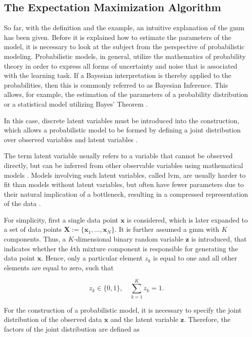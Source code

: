 \documentclass[../../../main.tex]{subfiles}
\begin{document}
\subsection{The Expectation Maximization Algorithm}
So far, with the definition and the example, an intuitive explanation of the \acrshort{gmm} has been given. Before it is explained how to estimate the parameters of the model, it is necessary to look at the subject from the perspective of probabilistic modeling. Probabilistic models, in general, utilize the mathematics of probability theory in order to express all forms of uncertainty and noise that is associated with the learning task. If a Bayesian interpretation is thereby applied to the probabilities, then this is commonly referred to as Bayesian Inference. This allows, for example, the estimation of the parameters of a probability distribution or a statistical model utilizing Bayes' Theorem \cite[p.245]{dei_2020}. 

In this case, discrete latent variables must be introduced into the construction, which allows a probabilistic model to be formed by defining a joint distribution over observed variables and latent variables \cite[432]{bis_2006}. 

The term latent variable usually refers to a variable that cannot be observed directly, but can be inferred from other observable variables using mathematical models \cite{bor_2003}. Models involving such latent variables, called \acrshort{lvm}, are usually harder to fit than models without latent variables, but often have fewer parameters due to their natural implication of a bottleneck, resulting in a compressed representation of the data \cite[337]{mur_2012}. 

For simplicity, first a single data point $\bm{x}$ is considered, which is later expanded to a set of data points $\bm{X}:=\{\bm{x}_1, \dots, \bm{x}_N\}$. It is further assumed a \acrshort{gmm} with $K$ components. Thus, a $K$-dimensional binary random variable $\bm{z}$ is introduced, that indicates whether the $k$th mixture component is responsible for generating the data point $\bm{x}$. Hence, only a particular element $z_k$ is equal to one and all other elements are equal to zero, such that

\begin{equation}
    z_k \in \{0,1\}, \quad \sum\limits^K_{k=1} z_k=1.
\end{equation}

For the construction of a probabilistic model, it is necessary to specify the joint distribution of the observed data $\bm{x}$ and the latent variable $\bm{z}$. Therefore, the factors of the joint distribution are defined as
\end{document}
